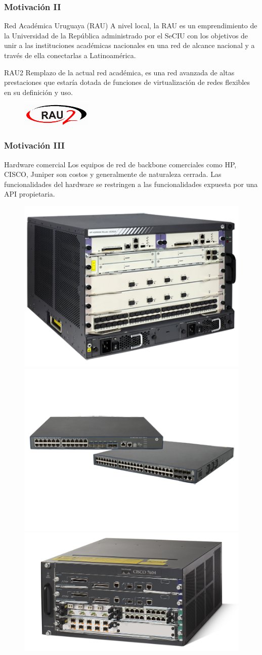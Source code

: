 \documentclass{beamer}
\begin{document}
\begin{frame}
\frametitle{Motivaci\'on II} 

\begin{block}{Red Académica Uruguaya (RAU)}
A nivel local, la RAU es un emprendimiento de la Universidad de la República administrado por el SeCIU con los objetivos de unir a las instituciones académicas nacionales en una red de alcance nacional y a trav\'es de ella conectarlas a Latinoam\'erica. 
\end{block}

\begin{block}{RAU2}
Remplazo de la actual red académica, es una red avanzada de altas prestaciones que estar\'ia dotada de funciones de virtualizaci\'on de redes flexibles en su definici\'on y uso.
\end{block}

\begin{figure}[h] 
\centering    
\includegraphics[width=0.3\textwidth]{imagenes/logorau2.png}
\label{fig:RAU}
\end{figure}

\end{frame}

\begin{frame}
\frametitle{Motivaci\'on III} 

\begin{block}{Hardware comercial}
Los equipos de red de backbone comerciales como HP, CISCO, Juniper son costos y generalmente de naturaleza cerrada. Las funcionalidades del hardware se restringen a las funcionalidades expuesta por
una API propietaria. 
\end{block}

\begin{figure}[htp]
\centering
\includegraphics[width=.25\textwidth]{imagenes/corerouter2.png}\hfill
\includegraphics[width=.35\textwidth]{imagenes/corerouter1.png}\hfill
\includegraphics[width=.35\textwidth]{imagenes/corerouter3.jpg}
\label{fig:figure3}
\end{figure}
\end{frame}
\end{document}
